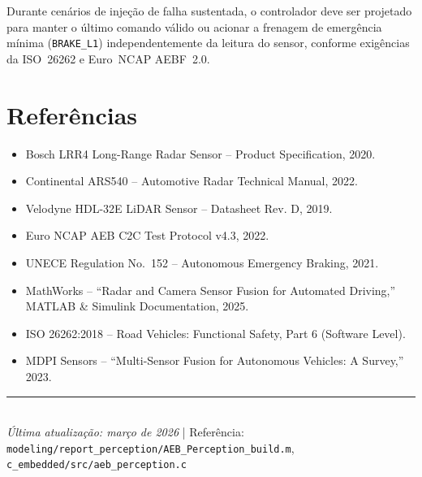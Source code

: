 \documentclass[12pt,a4paper]{article}
\begin{document}
\vspace{1cm}
\begin{atencaobox}
Durante cen\'arios de injeção de falha sustentada, o controlador deve ser
projetado para manter o \'ultimo comando v\'alido ou acionar a frenagem de
emerg\^encia m\'inima (\texttt{BRAKE\_L1}) independentemente da leitura do sensor,
conforme exig\^encias da ISO~26262 e Euro~NCAP AEBF~2.0.
\end{atencaobox}

\section*{Refer\^encias}

\begin{itemize}[leftmargin=*]
  \item Bosch LRR4 Long-Range Radar Sensor -- Product Specification, 2020.
  \item Continental ARS540 -- Automotive Radar Technical Manual, 2022.
  \item Velodyne HDL-32E LiDAR Sensor -- Datasheet Rev. D, 2019.
  \item Euro NCAP AEB C2C Test Protocol v4.3, 2022.
  \item UNECE Regulation No.\ 152 -- Autonomous Emergency Braking, 2021.
  \item MathWorks -- ``Radar and Camera Sensor Fusion for Automated Driving,''
    MATLAB \& Simulink Documentation, 2025.
  \item ISO 26262:2018 -- Road Vehicles: Functional Safety, Part 6 (Software Level).
  \item MDPI Sensors -- ``Multi-Sensor Fusion for Autonomous Vehicles: A Survey,'' 2023.
\end{itemize}

\vfill
\noindent\rule{\linewidth}{0.5pt}\\[2pt]
{\small\color{gray}
  \textit{\'Ultima atualiza\c{c}\~ao: mar\c{c}o de 2026} \quad|\quad
  Refer\^encia: \texttt{modeling/report\_perception/AEB\_Perception\_build.m},
  \texttt{c\_embedded/src/aeb\_perception.c}
}
\end{document}
